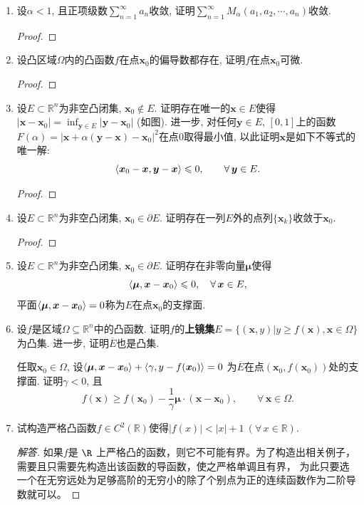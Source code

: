 \begin{3b}
\begin{enumerate}
\item 设\(\alpha<1\), 且正项级数\(\sum_{n=1}^{\infty}a_n\)收敛, 
证明\(\sum_{n=1}^{\infty}M_{\alpha}(a_1,a_2,\cdots,a_n)\)收敛.
\begin{proof}

\end{proof}
\item 设凸区域\(\varOmega\)内的凸函数\(f\)在点\(\boldsymbol{x}_0\)的偏导数都存在, 
证明\(f\)在点\(\boldsymbol{x}_0\)可微.
\begin{proof}

\end{proof}
\item 设\(E\subset\mathbb{R}^n\)为非空凸闭集, \(\boldsymbol{x}_0\notin E\). 
证明存在唯一的\(\boldsymbol{x}\in E\)使得\(|\boldsymbol{x}-\boldsymbol{x}_0|
=\inf_{\boldsymbol{y}\in E}|\boldsymbol{y}-\boldsymbol{x}_0|\) (如图). 
进一步, 对任何\(\boldsymbol{y}\in E\), \([0,1]\)上的函数\(F(\alpha)=|\boldsymbol{x}+\alpha(\boldsymbol{y}-\boldsymbol{x})-\boldsymbol{x}_0|^2\)在点\(0\)取得最小值, 
以此证明\(\boldsymbol{x}\)是如下不等式的唯一解:
\[\langle \boldsymbol{x}_0-\boldsymbol{x},\boldsymbol{y}-\boldsymbol{x} \rangle\leqslant 0,\qquad\forall\,\boldsymbol{y}\in E.\]
\begin{proof}

\end{proof}
\item 设\(E\subset\mathbb{R}^n\)为非空凸闭集, \(\boldsymbol{x}_0\in\partial E\). 
证明存在一列\(E\)外的点列\(\{\boldsymbol{x}_k\}\)收敛于\(\boldsymbol{x}_0\).
\begin{proof}

\end{proof}
\item 设\(E\subset\mathbb{R}^n\)为非空凸闭集, \(\boldsymbol{x}_0\in\partial E\). 
证明存在非零向量\(\boldsymbol{\mu}\)使得
\[\langle \boldsymbol{\mu},\boldsymbol{x}-\boldsymbol{x}_0 \rangle\leqslant 0,\quad\forall\,\boldsymbol{x}\in E,\]
平面\(\langle \boldsymbol{\mu},\boldsymbol{x}-\boldsymbol{x}_0 \rangle=0\)称为\(E\)在点\(\boldsymbol{x}_0\)的支撑面.
\item 设\(f\)是区域\(\varOmega\subseteq\mathbb{R}^n\)中的凸函数. 
证明\(f\)的\textbf{上镜集}\(E=\{(\boldsymbol{x},y)\big|y\geqslant f(\boldsymbol{x}),\boldsymbol{x}\in\varOmega\}\)为凸集. 进一步, 证明\(\overline{E}\)也是凸集.

任取\(\boldsymbol{x}_0\in\varOmega\), 设\(\langle \boldsymbol{\mu},\boldsymbol{x}-\boldsymbol{x}_0 \rangle+\langle \gamma,y-f(\boldsymbol{x}_0) \rangle=0\)
为\(\overline{E}\)在点\((\boldsymbol{x}_0,f(\boldsymbol{x}_0))\)处的支撑面. 证明\(\gamma<0\), 且
\[f(\boldsymbol{x})\geqslant f(\boldsymbol{x}_0)-\frac{1}{\gamma}\boldsymbol{\mu}\cdot(\boldsymbol{x}-\boldsymbol{x}_0),\qquad\forall\,\boldsymbol{x}\in\varOmega.\]
\item 试构造严格凸函数\(f\in C^2(\mathbb{R})\)使得\(|f(x)|<|x|+1\ (\forall\, x\in\mathbb{R})\).
\begin{proof}[解答]
如果$f$是 $\R$ 上严格凸的函数，则它不可能有界。为了构造出相关例子，
需要且只需要先构造出该函数的导函数，使之严格单调且有界，
为此只要选一个在无穷远处为足够高阶的无穷小的除了个别点为正的连续函数作为二阶导数就可以。


\end{proof}
\end{enumerate}
\end{3b}
